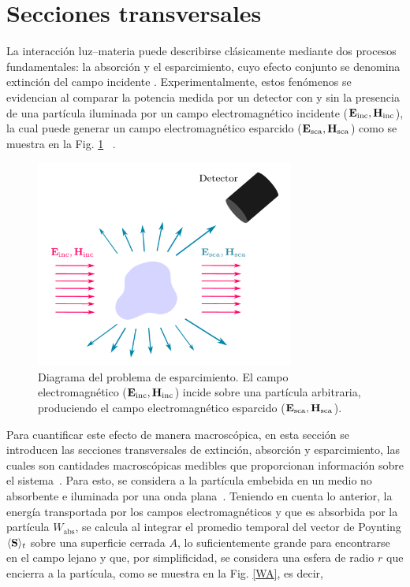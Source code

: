 

\section{Secciones transversales}
\label{section:yth}
La interacción luz–materia puede describirse clásicamente mediante dos procesos fundamentales: la absorción y el esparcimiento, cuyo efecto conjunto se denomina extinción del campo incidente \cite{bohrenAbsorptionScatteringLight2008}. Experimentalmente, estos fenómenos se evidencian al comparar la potencia medida por un detector con y sin la presencia de una partícula iluminada por un campo electromagnético incidente  ($\vb{E}_{\text{inc}}, \vb{H}_{\text{inc}}$), la cual puede generar un campo electromagnético esparcido ($\vb{E}_{\text{sca}}, \vb{H}_{\text{sca}}$) como se muestra en la Fig. \ref{scattering} ~\cite{bohrenAbsorptionScatteringLight2008}.
%
\begin{figure}[h]
	\centering
	\includegraphics[width=8.5cm]{../../Figuras/scattering.pdf}
	\caption{Diagrama del problema de esparcimiento. El campo electromagnético ($\vb{E}_{\text{inc}}, \vb{H}_{\text{inc}}$) incide sobre una partícula arbitraria, produciendo el campo electromagnético esparcido ($\vb{E}_{\text{sca}}, \vb{H}_{\text{sca}}$).}
	\label{scattering}
\end{figure}
%
Para cuantificar este efecto de manera macroscópica, en esta sección se introducen las secciones transversales de extinción, absorción y esparcimiento, las cuales son cantidades macroscópicas medibles que proporcionan información sobre el sistema~\cite{bohrenAbsorptionScatteringLight2008}. Para esto, se considera a la partícula embebida en un medio no absorbente e iluminada por una onda plana~\cite{bohrenAbsorptionScatteringLight2008}. Teniendo en cuenta lo anterior, la energía transportada por los campos electromagnéticos y que es absorbida por la partícula $W_{\text{abs}}$, se calcula al integrar el promedio temporal del vector de Poynting  $\langle\vb{S}\rangle_t$  sobre una superficie cerrada $A$, lo suficientemente grande para encontrarse en el campo lejano y que, por simplificidad, se considera una esfera de radio $r$ que encierra a la partícula, como se muestra en la Fig. \ref{WA}, es decir, 
